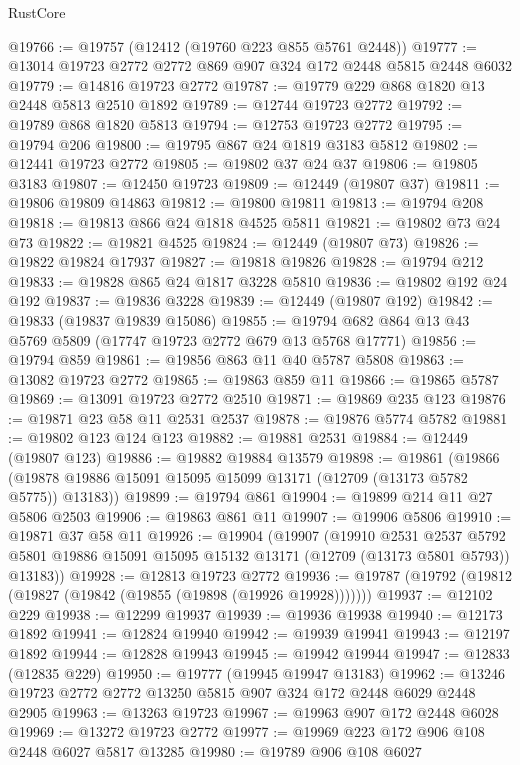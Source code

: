 \begin{lexlean}{RustCore}
\begin{coremodule}
@19766 := @19757 (@12412 (@19760 @223 @855 @5761 @2448))
@19777 := @13014 @19723 @2772 @2772 @869 @907 @324 @172 @2448 @5815 @2448 @6032
@19779 := @14816 @19723 @2772
@19787 := @19779 @229 @868 @1820 @13 @2448 @5813 @2510 @1892
@19789 := @12744 @19723 @2772
@19792 := @19789 @868 @1820 @5813
@19794 := @12753 @19723 @2772
@19795 := @19794 @206
@19800 := @19795 @867 @24 @1819 @3183 @5812
@19802 := @12441 @19723 @2772
@19805 := @19802 @37 @24 @37
@19806 := @19805 @3183
@19807 := @12450 @19723
@19809 := @12449 (@19807 @37)
@19811 := @19806 @19809 @14863
@19812 := @19800 @19811
@19813 := @19794 @208
@19818 := @19813 @866 @24 @1818 @4525 @5811
@19821 := @19802 @73 @24 @73
@19822 := @19821 @4525
@19824 := @12449 (@19807 @73)
@19826 := @19822 @19824 @17937
@19827 := @19818 @19826
@19828 := @19794 @212
@19833 := @19828 @865 @24 @1817 @3228 @5810
@19836 := @19802 @192 @24 @192
@19837 := @19836 @3228
@19839 := @12449 (@19807 @192)
@19842 := @19833 (@19837 @19839 @15086)
@19855 := @19794 @682 @864 @13 @43 @5769 @5809 (@17747 @19723 @2772 @679 @13 @5768 @17771)
@19856 := @19794 @859
@19861 := @19856 @863 @11 @40 @5787 @5808
@19863 := @13082 @19723 @2772
@19865 := @19863 @859 @11
@19866 := @19865 @5787
@19869 := @13091 @19723 @2772 @2510
@19871 := @19869 @235 @123
@19876 := @19871 @23 @58 @11 @2531 @2537
@19878 := @19876 @5774 @5782
@19881 := @19802 @123 @124 @123
@19882 := @19881 @2531
@19884 := @12449 (@19807 @123)
@19886 := @19882 @19884 @13579
@19898 := @19861
    (@19866 (@19878 @19886 @15091 @15095 @15099 @13171 (@12709 (@13173 @5782 @5775)) @13183))
@19899 := @19794 @861
@19904 := @19899 @214 @11 @27 @5806 @2503
@19906 := @19863 @861 @11
@19907 := @19906 @5806
@19910 := @19871 @37 @58 @11
@19926 := @19904
    (@19907
      (@19910
        @2531
        @2537
        @5792
        @5801
        @19886
        @15091
        @15095
        @15132
        @13171
        (@12709 (@13173 @5801 @5793))
        @13183))
@19928 := @12813 @19723 @2772
@19936 := @19787 (@19792 (@19812 (@19827 (@19842 (@19855 (@19898 (@19926 @19928)))))))
@19937 := @12102 @229
@19938 := @12299 @19937
@19939 := @19936 @19938
@19940 := @12173 @1892
@19941 := @12824 @19940
@19942 := @19939 @19941
@19943 := @12197 @1892
@19944 := @12828 @19943
@19945 := @19942 @19944
@19947 := @12833 (@12835 @229)
@19950 := @19777 (@19945 @19947 @13183)
@19962 := @13246 @19723 @2772 @2772 @13250 @5815 @907 @324 @172 @2448 @6029 @2448 @2905
@19963 := @13263 @19723
@19967 := @19963 @907 @172 @2448 @6028
@19969 := @13272 @19723 @2772
@19977 := @19969 @223 @172 @906 @108 @2448 @6027 @5817 @13285
@19980 := @19789 @906 @108 @6027

\end{coremodule}
\end{lexlean}
